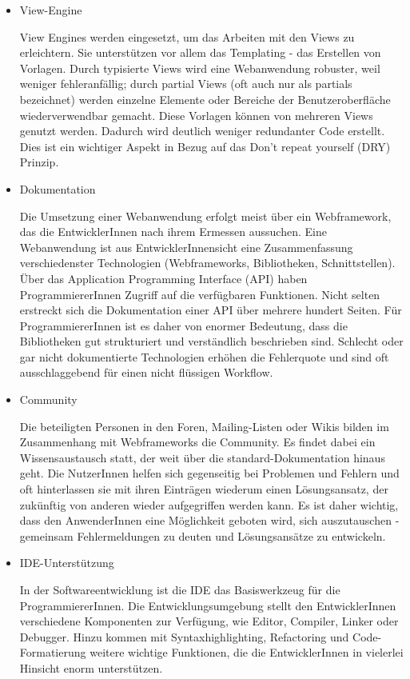 \documentclass[abstracton, listof=totocnumbered,
bibliography=totocnumbered]{scrreprt}
\begin{document}
\begin{itemize}
  \item View-Engine

View Engines werden eingesetzt, um das Arbeiten mit den Views zu erleichtern.
Sie unterstützen vor allem das Templating - das Erstellen von Vorlagen. Durch
typisierte Views wird eine Webanwendung robuster, weil weniger fehleranfällig;
durch partial Views (oft auch nur als partials bezeichnet) werden einzelne
Elemente oder Bereiche der Benutzeroberfläche wiederverwendbar gemacht. Diese
Vorlagen können von mehreren Views genutzt werden. Dadurch wird deutlich
weniger redundanter Code erstellt. Dies ist ein wichtiger Aspekt in Bezug auf
das Don’t repeat yourself (DRY) Prinzip.

  \item Dokumentation

Die Umsetzung einer Webanwendung erfolgt meist über ein Webframework, das die
EntwicklerInnen nach ihrem Ermessen aussuchen. Eine Webanwendung ist aus
EntwicklerInnensicht eine Zusammenfassung verschiedenster Technologien
(Webframeworks, Bibliotheken, Schnittstellen). Über das Application Programming
Interface (API) haben ProgrammiererInnen Zugriff auf die verfügbaren
Funktionen. Nicht selten erstreckt sich die Dokumentation einer API über
mehrere hundert Seiten. Für ProgrammiererInnen ist es daher von enormer
Bedeutung, dass die Bibliotheken gut strukturiert und verständlich beschrieben
sind. Schlecht oder gar nicht dokumentierte Technologien erhöhen die
Fehlerquote und sind oft ausschlaggebend für einen nicht flüssigen Workflow.

  \item Community

Die beteiligten Personen in den Foren, Mailing-Listen oder Wikis bilden im
Zusammenhang mit Webframeworks die Community. Es findet dabei ein
Wissensaustausch statt, der weit über die standard-Dokumentation hinaus geht.
Die NutzerInnen helfen sich gegenseitig bei Problemen und Fehlern und oft
hinterlassen sie mit ihren Einträgen wiederum einen Lösungsansatz, der
zukünftig von anderen wieder aufgegriffen werden kann. Es ist daher wichtig,
dass den AnwenderInnen eine Möglichkeit geboten wird, sich auszutauschen -
gemeinsam Fehlermeldungen zu deuten und Lösungsansätze zu entwickeln.

  \item IDE-Unterstützung

In der Softwareentwicklung ist die IDE das Basiswerkzeug für die
ProgrammiererInnen. Die Entwicklungsumgebung stellt den EntwicklerInnen
verschiedene Komponenten zur Verfügung, wie Editor, Compiler, Linker oder
Debugger. Hinzu kommen mit Syntaxhighlighting, Refactoring und
Code-Formatierung weitere wichtige Funktionen, die die EntwicklerInnen in
vielerlei Hinsicht enorm unterstützen.


\end{itemize}
\end{document}
